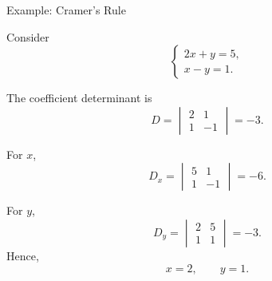 
\begin{frame}{Example: Cramer's Rule}

Consider
\vspace{-0.1cm}
\[
\begin{cases}
2x+y=5,\\
x-y=1.
\end{cases}
\]

The coefficient determinant is
\vspace{-0.1cm}
\[
D=
\begin{vmatrix}
2&1\\
1&-1
\end{vmatrix}
=-3.
\]

For $x$,
\vspace{-0.1cm}
\[
D_x=
\begin{vmatrix}
5&1\\
1&-1
\end{vmatrix}
=-6.
\]

For $y$,
\vspace{-0.1cm}
\[
D_y=
\begin{vmatrix}
2&5\\
1&1
\end{vmatrix}
=-3.
\]
\vspace{-0.1cm}
Hence,
\vspace{-0.1cm}
\[
\boxed{
x=2,\qquad y=1.
}
\]

\end{frame}




